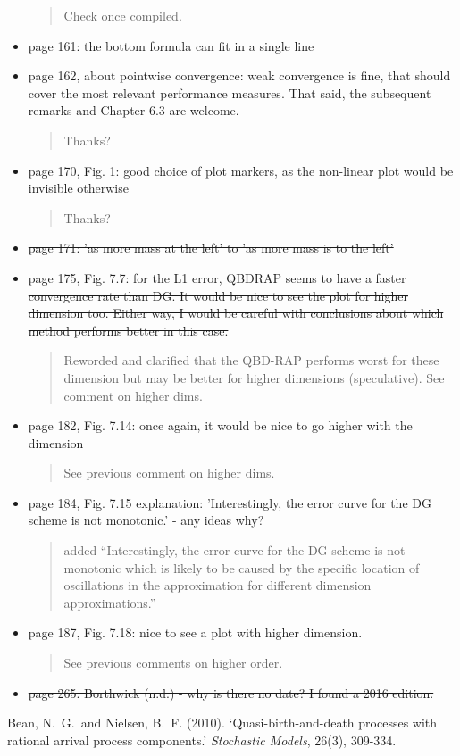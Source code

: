 \documentclass[a4paper]{article}
\begin{document}
\begin{itemize}
\begin{quote}
    Check once compiled.
\end{quote}
\item \st{page 161: the bottom formula can fit in a single line}
\item page 162, about pointwise convergence: weak convergence is fine, that should cover
the most relevant performance measures. That said, the subsequent remarks and
Chapter 6.3 are welcome.
\begin{quote}
    Thanks?
\end{quote}
\item page 170, Fig. 1: good choice of plot markers, as the non-linear plot would be
invisible otherwise
\begin{quote}
    Thanks?
\end{quote}
\item \st{page 171: 'as more mass at the left' to 'as more mass is to the left'}
\item \st{page 175, Fig. 7.7: for the L1 error, QBDRAP seems to have a faster convergence
rate than DG. It would be nice to see the plot for higher dimension too. Either
way, I would be careful with conclusions about which method performs better in
this case.}
\begin{quote}
    Reworded and clarified that the QBD-RAP performs worst for these dimension but may be better for higher dimensions (speculative). See comment on higher dims.
\end{quote}
\item page 182, Fig. 7.14: once again, it would be nice to go higher with the dimension
\begin{quote}
    See previous comment on higher dims.
\end{quote}
\item page 184, Fig. 7.15 explanation: 'Interestingly, the error curve for the DG scheme
is not monotonic.' - any ideas why?
\begin{quote}
    added ``Interestingly, the error curve for the DG scheme
    is not monotonic which is likely to be caused by the specific location of oscillations in the approximation for different dimension approximations.''
\end{quote}
\item page 187, Fig. 7.18: nice to see a plot with higher dimension.
\begin{quote}
    See previous comments on higher order.
\end{quote}
\item \st{page 265: Borthwick (n.d.) - why is there no date? I found a 2016 edition.}
\end{itemize}

\begin{thebibliography}{9}
    Bean, N.~G.~and Nielsen, B.~F. (2010). {`Quasi-birth-and-death processes with rational arrival process components.}' \textit{Stochastic Models}, 26(3), 309-334.
\end{thebibliography}
\end{document}
